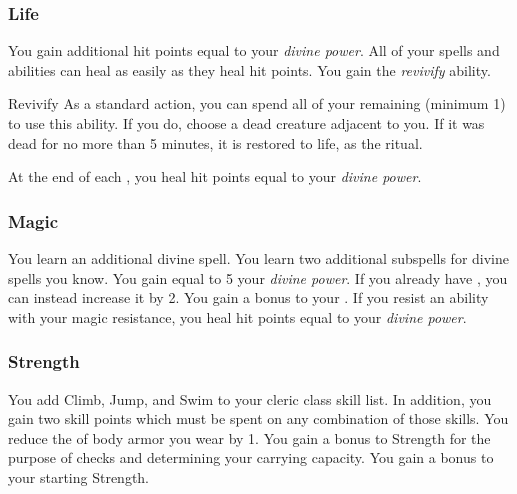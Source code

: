         \subsubsection{Life}
             You gain additional hit points equal to your \textit{divine power}.
             All of your  spells and abilities can heal  as easily as they heal hit points.
             You gain the \textit{revivify} ability.
            \begin{ability}{Revivify}
                As a standard action, you can spend all of your remaining  (minimum 1) to use this ability.
                If you do, choose a dead creature adjacent to you.
                If it was dead for no more than 5 minutes, it is restored to life, as the  ritual.
            \end{ability}
             At the end of each , you heal hit points equal to your \textit{divine power}.

        \subsubsection{Magic}
             You learn an additional divine spell.
             You learn two additional subspells for divine spells you know.
             You gain  equal to 5 \add your \textit{divine power}.
            If you already have , you can instead increase it by 2.
             You gain a  bonus to your .
            If you resist an ability with your magic resistance, you heal hit points equal to your \textit{divine power}.

        \subsubsection{Strength}
             You add Climb, Jump, and Swim to your cleric class skill list.
            In addition, you gain two skill points which must be spent on any combination of those skills.
             You reduce the  of body armor you wear by 1.
             You gain a  bonus to Strength for the purpose of checks and determining your carrying capacity.
             You gain a  bonus to your starting Strength.

